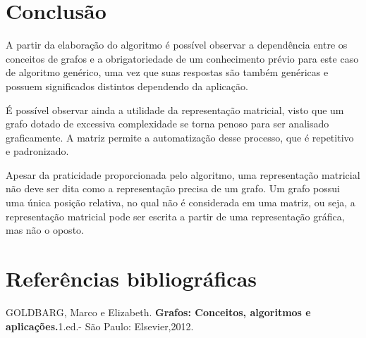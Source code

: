 \documentclass[a4paper, 12pt]{article}
\begin{document}
\section{Conclusão}

    A partir da elaboração do algoritmo é possível observar a dependência entre os conceitos de grafos e a obrigatoriedade de um conhecimento prévio para este caso de algoritmo genérico, uma vez que suas respostas são também genéricas e possuem significados distintos dependendo da aplicação. 
    
    \indent É possível observar ainda a utilidade da representação matricial, visto que um grafo dotado de excessiva complexidade se torna penoso para ser analisado graficamente. A matriz permite a automatização desse processo, que é repetitivo e padronizado.
    
    \indent Apesar da praticidade proporcionada pelo algoritmo, uma representação matricial não deve ser dita como a representação precisa de um grafo. Um grafo possui uma única posição relativa, no qual não é considerada em uma matriz, ou seja, a representação matricial pode ser escrita a partir de uma representação gráfica, mas não o oposto.

\section{Referências bibliográficas}
GOLDBARG, Marco e Elizabeth. \textbf{Grafos: Conceitos, algoritmos e aplicações.}1.ed.- São Paulo: Elsevier,2012.
\end{document}

